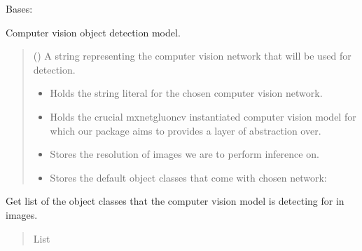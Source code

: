 \documentclass[letterpaper,10pt,english]{sphinxmanual}
\begin{document}
\begin{fulllineitems}
\label{\detokenize{comp_viz.object_detection:comp_viz.object_detection.model.Model}}
\pysigstartsignatures
{}
\pysigstopsignatures
\sphinxAtStartPar
Bases: 

\sphinxAtStartPar
Computer vision object detection model.
\begin{quote}\begin{description}
\sphinxAtStartPar
{} () \textendash{} A string representing the computer vision network that will be used
for detection.

\begin{itemize}
\item {} 
\sphinxAtStartPar
{} \textendash{} Holds the string literal for the chosen computer vision network.

\item {} 
\sphinxAtStartPar
{} \textendash{} Holds the crucial mxnet\sphinxhyphen{}gluoncv instantiated computer vision model for which
our package aims to provides a layer of abstraction over.

\item {} 
\sphinxAtStartPar
{} \textendash{} Stores the resolution of images we are to perform inference on.

\item {} 
\sphinxAtStartPar
{} \textendash{} Stores the default object classes that come with chosen network:

\end{itemize}

\end{description}\end{quote}

\begin{fulllineitems}
\label{\detokenize{comp_viz.object_detection:comp_viz.object_detection.model.Model.get_classes}}
\pysigstartsignatures
{}
\pysigstopsignatures
\sphinxAtStartPar
Get list of the object classes that the computer vision model is detecting for in images.
\begin{quote}\begin{description}
\sphinxAtStartPar
List


\end{description}
\end{quote}
\end{fulllineitems}
\end{fulllineitems}
\end{document}

